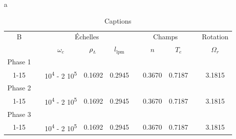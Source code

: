 \begin{refsection}
a
\begin{table}
\footnotesize\centering
{}
\begin{tabular}{@{}cccccccccc@{}}\toprule
B&&\multicolumn{3}{c}{Échelles} && \multicolumn{2}{c}{Champs} &&
Rotation\\
\cmidrule{3-5} \cmidrule{7-8} \cmidrule{10-10}
&& $\omega_c$ & $\rho_{_{L}}$& $l_{\text{lpm}}$&& $n$ & $T_e$ && 
$\Omega_r$\\
\midrule Phase 1\\
\scriptsize 1-15 &&\scriptsize 10\textsuperscript{4} - 2 10\textsuperscript{5} &
\scriptsize0.1692 &\scriptsize 0.2945 && \scriptsize0.3670 &\scriptsize 0.7187
&& \scriptsize3.1815 \\
Phase 2\\
\scriptsize1-15 &&\scriptsize 10\textsuperscript{4} - 2 10\textsuperscript{5} &
\scriptsize0.1692 &\scriptsize 0.2945 &&\scriptsize 0.3670 &\scriptsize 0.7187
&&\scriptsize 3.1815 \\
Phase 3\\
\scriptsize1-15 &&\scriptsize 10\textsuperscript{4} - 2 10\textsuperscript{5} &
\scriptsize0.1692 &\scriptsize 0.2945 &&\scriptsize 0.3670 &\scriptsize 0.7187
&&\scriptsize 3.1815 \\

\bottomrule
\end{tabular}
\caption{Captions}
\end{table}
	

\end{refsection}
